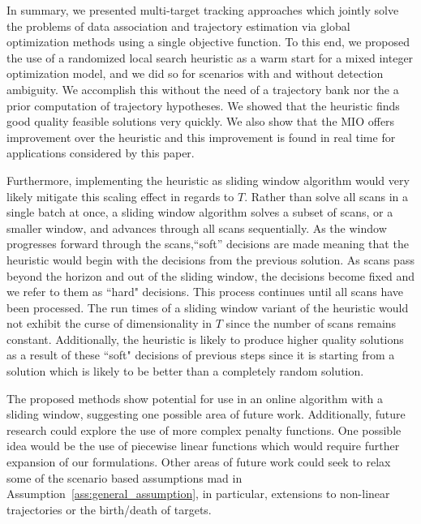In summary, we presented multi-target tracking approaches which jointly solve the problems of data association and trajectory estimation via global optimization methods using a single objective function. To this end, we proposed the use of a randomized local search heuristic as a warm start for a mixed integer optimization model, and we did so for scenarios with and without detection ambiguity. We accomplish this without the need of a trajectory bank nor the a prior computation of trajectory hypotheses. We showed that the heuristic finds good quality feasible solutions very quickly. We also show that the MIO offers improvement over the heuristic and this improvement is found in real time for applications considered by this paper.  

Furthermore, implementing the heuristic as sliding window algorithm would very likely mitigate this scaling effect in regards to $T$. Rather than solve all scans in a single batch at once, a sliding window algorithm solves a subset of scans, or a smaller window, and advances through all scans sequentially.  As the window progresses forward through the scans,``soft'' decisions are made meaning that the heuristic would begin with the decisions from the previous solution. As scans pass beyond the horizon and out of the sliding window, the decisions become fixed and we refer to them as ``hard" decisions. This process continues until all scans have been processed. The run times of a sliding window variant of the heuristic would not exhibit the curse of dimensionality in $T$ since the number of scans remains constant. Additionally, the heuristic is likely to produce higher quality solutions as a result of these ``soft" decisions of previous steps since it is starting from a solution which is likely to be better than a completely random solution. 

The proposed methods show potential for use in an online algorithm with a sliding window, suggesting one possible area of future work. Additionally, future research could explore the use of more complex penalty functions. One possible idea would be the use of piecewise linear functions which would require further expansion of our formulations. Other areas of future work could seek to relax some of the scenario based assumptions mad in Assumption~\ref{ass:general_assumption}, in particular, extensions to non-linear trajectories or the birth/death of targets. 